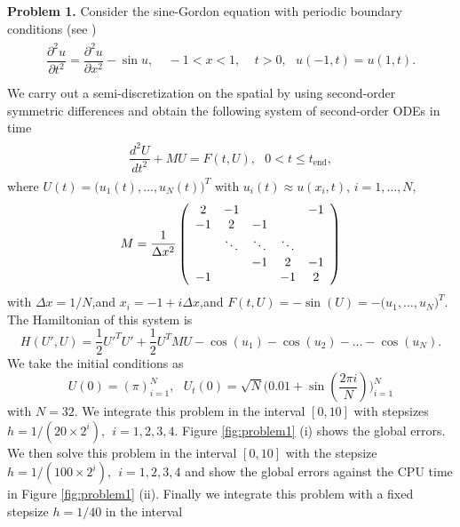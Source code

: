 \documentclass{article}
\begin{document}
\vskip1mm \noindent   \textbf{Problem 1.} Consider the sine-Gordon
 equation with periodic boundary conditions (see \cite{smmmeijer1987})
\begin{eqnarray*}
\begin{array}{ll}
\dfrac{\partial^2u}{\partial t^2}=\dfrac{\partial^2u}{\partial
x^2}-\sin u,\ \ \ \ \ -1<x<1,\ \ \ \ \ t>0,\ \ \
u(-1,t)=u(1,t).\\[0.3cm]

\end{array}
\end{eqnarray*}
 We carry out a semi-discretization on the spatial by using
 second-order symmetric differences and obtain the following system
 of second-order ODEs in time
\begin{eqnarray*}
\begin{array}{ll}
\dfrac{d^2U}{dt^2}+MU=F(t,U),\ \ \ 0<t\leq t_{\mathrm{end}},
\end{array}\label{pro4}
\end{eqnarray*}
where $U(t)=\big(u_{1}(t),\ldots,u_{N}(t)\big)^{T}$ with
$u_{i}(t)\approx u(x_{i},t)$, $i=1,\ldots,N,$
\begin{eqnarray*}
M=\dfrac{1}{\Delta x^2}\left(
\begin{array}
[c]{ccccc}%
2&-1 && &-1\\
-1 &2 & -1&  &  \\
 &\ddots&\ddots&\ddots& \\
&&-1 &2 & -1\\
-1& & &-1&2 \\
\end{array}
\right)
\end{eqnarray*}
with $\Delta x= 1/N$,and  $x_i =-1+ i\Delta x$,and
$F(t,U)=-\sin(U)=-\big(u_{1},\ldots,u_{N}\big)^{T}.$ The
  Hamiltonian of this system is
\begin{equation*}
H(U',U)=\dfrac{1}{2}U'^{T}U'+\dfrac{1}{2}U^{T}MU-\cos(u_{1})-\cos(u_{2})-\ldots-\cos(u_{N}).
\end{equation*}
We take the initial conditions as
\[
U(0)=(\pi)_{i=1}^{N},\ \ \ U_{t}(0)=\sqrt{N}\Big(0.01+\sin(\dfrac{2 \pi i}%
{N})\Big)_{i=1}^{N}
\]
with $N=32$. We integrate this problem in the interval $[0,10]$ with
stepsizes $h=1/(20\times 2^{i}), \ \ i=1,2,3,4$. Figure
\ref{fig:problem1} (i) shows the global errors. We then solve this
problem in the interval $[0,10]$ with the stepsize $h=1/(100\times
2^{i}),\ \ i=1,2,3,4$ and show the global errors against the CPU
time in Figure \ref{fig:problem1} (ii). Finally we integrate this
problem with a fixed stepsize $h=1/40$ in the interval
\end{document}
